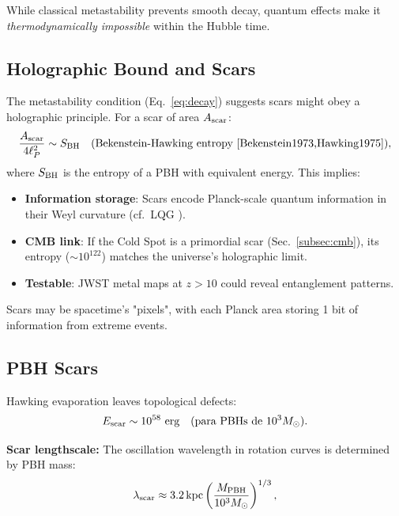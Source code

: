 \documentclass{article}
\begin{document}
\begin{tcolorbox}[colback=boxnormal,title=Key Implication]  
While classical metastability prevents smooth decay, quantum effects make it \textit{thermodynamically impossible} within the Hubble time.  
\end{tcolorbox}  

\subsection{Holographic Bound and Scars}  
The metastability condition (Eq.~\ref{eq:decay}) suggests scars might obey a holographic principle. For a scar of area $A_{\rm scar}$:  
\begin{equation}  
\frac{A_{\rm scar}}{4\ell_P^2} \sim S_{\rm BH} \quad \text{(Bekenstein-Hawking entropy \cite{Bekenstein1973,Hawking1975})},  
\label{eq:holography}  
\end{equation}  
where $S_{\rm BH}$ is the entropy of a PBH with equivalent energy. This implies:  
\begin{itemize}  
  \item \textbf{Information storage}: Scars encode Planck-scale quantum information in their Weyl curvature (cf.~LQG \cite{Ashtekar2016}).  
  \item \textbf{CMB link}: If the Cold Spot is a primordial scar (Sec.~\ref{subsec:cmb}), its entropy ($\sim 10^{122}$) matches the universe's holographic limit.  
  \item \textbf{Testable}: JWST metal maps at $z > 10$ could reveal entanglement patterns.  
\end{itemize}  

\begin{tcolorbox}[colback=boxnormal,colframe=blue!50!black,title=Cosmic Holography]  
Scars may be spacetime's "pixels", with each Planck area storing 1 bit of information from extreme events.  
\end{tcolorbox}

\subsection{PBH Scars}  
\FloatBarrier
\label{subsec:pbh_scars}
Hawking evaporation leaves topological defects:  
\begin{equation}  
E_{\rm scar} \sim 10^{58} \text{ erg} \quad \text{(para PBHs de } 10^3 M_\odot).  
\end{equation}  

\textbf{Scar lengthscale:} The oscillation wavelength in rotation curves is determined by PBH mass:
\begin{equation}
\lambda_{\rm scar} \approx 3.2\,\text{kpc} \left(\frac{M_{\rm PBH}}{10^3 M_\odot}\right)^{1/3},
\label{eq:lambda_scar}
\end{equation}
\end{document}
